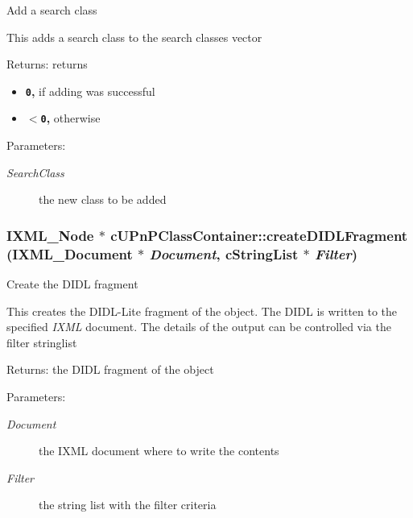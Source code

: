 Add a search class

This adds a search class to the search classes vector

\begin{Desc}
\item[Returns:]returns\begin{itemize}
\item {\bf {\tt 0},} if adding was successful\item {\bf {\tt $<$0},} otherwise \end{itemize}
\end{Desc}
\begin{Desc}
\item[Parameters:]
\begin{description}
\item[{\em SearchClass}]the new class to be added \end{description}
\end{Desc}
\hypertarget{classcUPnPClassContainer_fec5b0bae4ed2d194bfc9973f14a3926}{
\subsubsection[{createDIDLFragment}]{\setlength{\rightskip}{0pt plus 5cm}IXML\_\-Node $\ast$ cUPnPClassContainer::createDIDLFragment (IXML\_\-Document $\ast$ {\em Document}, \/  cStringList $\ast$ {\em Filter})}}
\label{classcUPnPClassContainer_fec5b0bae4ed2d194bfc9973f14a3926}


Create the DIDL fragment

This creates the DIDL-Lite fragment of the object. The DIDL is written to the specified {\em IXML\/} document. The details of the output can be controlled via the filter stringlist

\begin{Desc}
\item[Returns:]the DIDL fragment of the object \end{Desc}
\begin{Desc}
\item[Parameters:]
\begin{description}
\item[{\em Document}]the IXML document where to write the contents \item[{\em Filter}]the string list with the filter criteria \end{description}
\end{Desc}


